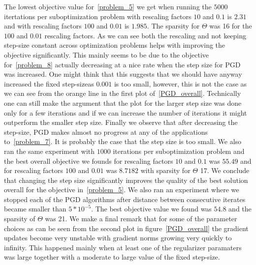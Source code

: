 \documentclass{article}
\newcommand{\0}{\mathrm{0}}
\newcommand{\1}{\mathrm{1}}
\begin{document}
The lowest objective value for~\ref{problem_5} we get when running the $5000$ itertations per suboptimization problem with rescaling factors $10$ and $0.1$ is $2.31$ and with rescaling factors $100$ and $0.01$ is $1.985$.  The sparsity for $\Theta$ was 16 for the $100$ and $0.01$ rescaling factors. As we can see both the rescaling and not keeping step-size constant across optimization problems helps with improving the objective significantly. This mainly seems to be due to the objective for~\ref{problem_8} actually decreasing at a nice rate when the step size for PGD was increased. One might think that this suggests that we should have anyway increased the fixed step-sizeas $0.001$ is too small, however, this is not the case as we can see from the orange line in the first plot of~\ref{PGD_overall}. Technically one can still make the argument that the plot for the larger step size was done only for a few iterations and if we can increase the number of iterations it might outperform the smaller step size. Finally we observe that after decreasing the step-size, PGD makes almost no progress at any of the applications to~\ref{problem_7}. It is probably the case that the step size is too small. We also ran the same experiment with $1000$ iterations per suboptimization problem and the best overall objective we founds for rescaling factors $10$ and $0.1$ was $55.49$ and for rescaling factors $100$ and $0.01$ was $8.7182$ with sparsity for $\Theta$ 17. We conclude that changing the step size significantly improves the quality of the best solution overall for the objective in~\ref{problem_5}. We also ran an experiment where we stopped each of the PGD algorithms after distance between consecutive iterates became smaller than $5*10^{-5}$. The best objective value we found was $54.8$ and the sparsity of $\Theta$ was 21. We make a final remark that for some of the parameter choices as can be seen from the second plot in figure~\ref{PGD_overall} the gradient updates become very unstable with gradient norms growing very quickly to infinity. This happened mainly when at least one of the regularizer paramaters was large together with a moderate to large value of the fixed step-size.
\end{document}

